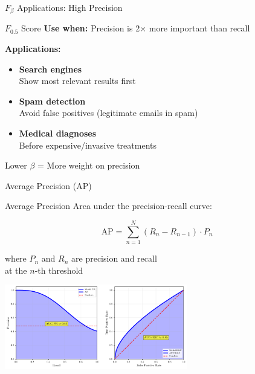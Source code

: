 \documentclass{beamer}
\begin{document}
\begin{frame}{$F_\beta$ Applications: High Precision}
\begin{examplebox}{$F_{0.5}$ Score}
\textbf{Use when:} Precision is 2× more important than recall

\vspace{0.15cm}

\textbf{Applications:}
\begin{itemize}
    \item \textbf{Search engines} \\
          Show most relevant results first

    \vspace{0.2cm}

    \item \textbf{Spam detection} \\
          Avoid false positives (legitimate emails in spam)

    \vspace{0.2cm}

    \item \textbf{Medical diagnoses} \\
          Before expensive/invasive treatments
\end{itemize}
\end{examplebox}

\vspace{0.15cm}

\begin{center}
Lower $\beta$ = More weight on precision
\end{center}
\end{frame}

\begin{frame}{Average Precision (AP)}
\begin{definitionbox}{Average Precision}
\small
Area under the precision-recall curve:

$$\text{AP} = \sum_{n=1}^{N} (R_n - R_{n-1}) \cdot P_n$$

where $P_n$ and $R_n$ are precision and recall \\
at the $n$-th threshold
\end{definitionbox}

\vspace{0.15cm}

\begin{center}
\includegraphics[width=0.6\textwidth]{auc-diagram.pdf}
\end{center}
\end{frame}
\end{document}
